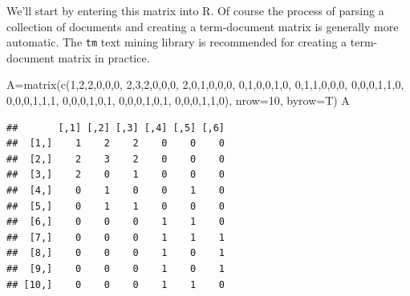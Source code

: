 \documentclass[
]{article}
\newenvironment{Shaded}{\begin{snugshade}}{\end{snugshade}}
\newcommand{\AttributeTok}[1]{\textcolor[rgb]{0.77,0.63,0.00}{#1}}
\newcommand{\DecValTok}[1]{\textcolor[rgb]{0.00,0.00,0.81}{#1}}
\newcommand{\FunctionTok}[1]{\textcolor[rgb]{0.00,0.00,0.00}{#1}}
\newcommand{\NormalTok}[1]{#1}
\newcommand{\OtherTok}[1]{\textcolor[rgb]{0.56,0.35,0.01}{#1}}
\theoremstyle{definition}
\theoremstyle{definition}
\theoremstyle{definition}
\theoremstyle{definition}
\theoremstyle{remark}
\begin{document}
We'll start by entering this matrix into R. Of course the process of parsing a collection of documents and creating a term-document matrix is generally more automatic. The \texttt{tm} text mining library is recommended for creating a term-document matrix in practice.

\begin{Shaded}
\begin{Highlighting}[]
\NormalTok{A}\OtherTok{=}\FunctionTok{matrix}\NormalTok{(}\FunctionTok{c}\NormalTok{(}\DecValTok{1}\NormalTok{,}\DecValTok{2}\NormalTok{,}\DecValTok{2}\NormalTok{,}\DecValTok{0}\NormalTok{,}\DecValTok{0}\NormalTok{,}\DecValTok{0}\NormalTok{,}
           \DecValTok{2}\NormalTok{,}\DecValTok{3}\NormalTok{,}\DecValTok{2}\NormalTok{,}\DecValTok{0}\NormalTok{,}\DecValTok{0}\NormalTok{,}\DecValTok{0}\NormalTok{,}
           \DecValTok{2}\NormalTok{,}\DecValTok{0}\NormalTok{,}\DecValTok{1}\NormalTok{,}\DecValTok{0}\NormalTok{,}\DecValTok{0}\NormalTok{,}\DecValTok{0}\NormalTok{,}
           \DecValTok{0}\NormalTok{,}\DecValTok{1}\NormalTok{,}\DecValTok{0}\NormalTok{,}\DecValTok{0}\NormalTok{,}\DecValTok{1}\NormalTok{,}\DecValTok{0}\NormalTok{,}
           \DecValTok{0}\NormalTok{,}\DecValTok{1}\NormalTok{,}\DecValTok{1}\NormalTok{,}\DecValTok{0}\NormalTok{,}\DecValTok{0}\NormalTok{,}\DecValTok{0}\NormalTok{,}
           \DecValTok{0}\NormalTok{,}\DecValTok{0}\NormalTok{,}\DecValTok{0}\NormalTok{,}\DecValTok{1}\NormalTok{,}\DecValTok{1}\NormalTok{,}\DecValTok{0}\NormalTok{,}
           \DecValTok{0}\NormalTok{,}\DecValTok{0}\NormalTok{,}\DecValTok{0}\NormalTok{,}\DecValTok{1}\NormalTok{,}\DecValTok{1}\NormalTok{,}\DecValTok{1}\NormalTok{,}
           \DecValTok{0}\NormalTok{,}\DecValTok{0}\NormalTok{,}\DecValTok{0}\NormalTok{,}\DecValTok{1}\NormalTok{,}\DecValTok{0}\NormalTok{,}\DecValTok{1}\NormalTok{,}
           \DecValTok{0}\NormalTok{,}\DecValTok{0}\NormalTok{,}\DecValTok{0}\NormalTok{,}\DecValTok{1}\NormalTok{,}\DecValTok{0}\NormalTok{,}\DecValTok{1}\NormalTok{,}
           \DecValTok{0}\NormalTok{,}\DecValTok{0}\NormalTok{,}\DecValTok{0}\NormalTok{,}\DecValTok{1}\NormalTok{,}\DecValTok{1}\NormalTok{,}\DecValTok{0}\NormalTok{), }
         \AttributeTok{nrow=}\DecValTok{10}\NormalTok{, }\AttributeTok{byrow=}\NormalTok{T)}
\NormalTok{A}
\end{Highlighting}
\end{Shaded}

\begin{verbatim}
##       [,1] [,2] [,3] [,4] [,5] [,6]
##  [1,]    1    2    2    0    0    0
##  [2,]    2    3    2    0    0    0
##  [3,]    2    0    1    0    0    0
##  [4,]    0    1    0    0    1    0
##  [5,]    0    1    1    0    0    0
##  [6,]    0    0    0    1    1    0
##  [7,]    0    0    0    1    1    1
##  [8,]    0    0    0    1    0    1
##  [9,]    0    0    0    1    0    1
## [10,]    0    0    0    1    1    0
\end{verbatim}
\end{document}
